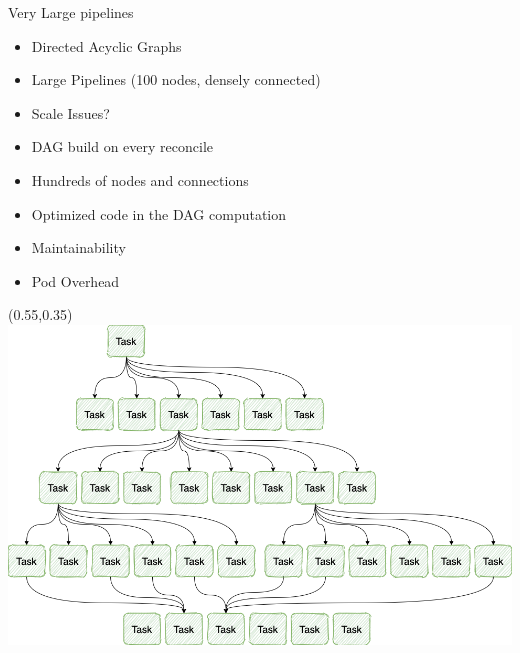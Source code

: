 \documentclass[aspectratio=169,11pt,hyperref={colorlinks=true}]{beamer}
\begin{document}
{
\begin{tblackbgrayframe}{Very Large pipelines}
  \begin{itemize}
    \item Directed Acyclic Graphs
    \item Large Pipelines (100 nodes, densely connected)
    \item Scale Issues?
  \end{itemize}
  \begin{itemize}
    \item DAG build on every reconcile
    \item Hundreds of nodes and connections
    \item Optimized code in the DAG computation
  \end{itemize}
  \begin{itemize}
    \item Maintainability
    \item Pod Overhead
  \end{itemize}
  \begin{textblock*}{0.42\paperwidth}(0.55\paperwidth,0.35\paperheight)
    \includegraphics[width=0.42\paperwidth]{img/tekton-large-dag.png}
  \end{textblock*}
\end{tblackbgrayframe}
}
\end{document}
